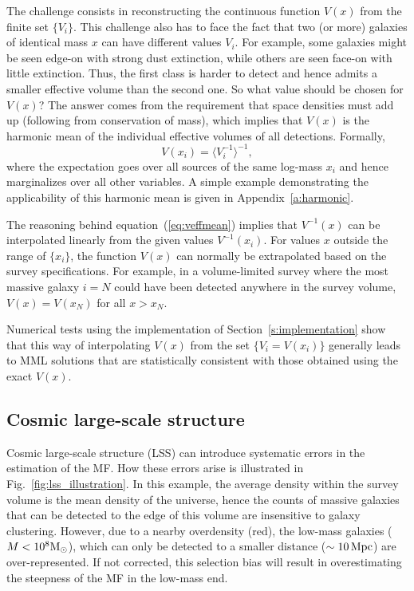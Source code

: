 \documentclass[a4paper,fleqn,usenatbib]{mnras}
\newcommand{\be}{\begin{equation}}
\newcommand{\ee}{\end{equation}}
\newcommand{\msun}{{\rm M}_{\odot}}
\newcommand{\veff}{V}%
\newcommand{\fig}[1]{Fig.~\ref{fig:#1}}
\newcommand{\eq}[1]{equation~(\ref{eq:#1})}
\newcommand{\s}[1]{Section~\ref{s:#1}}
\renewcommand{\a}[1]{Appendix~\ref{a:#1}}
\begin{document}
The challenge consists in reconstructing the continuous function $\veff(x)$ from the finite set $\{V_i\}$. This challenge also has to face the fact that two (or more) galaxies of identical mass $x$ can have different values $V_i$. For example, some galaxies might be seen edge-on with strong dust extinction, while others are seen face-on with little extinction. Thus, the first class is harder to detect and hence admits a smaller effective volume than the second one. So what value should be chosen for $\veff(x)$? The answer comes from the requirement that space densities must add up (following from conservation of mass), which implies that $\veff(x)$ is the harmonic mean of the individual effective volumes of all detections. Formally,
%
\be\label{eq:veffmean}
	\veff(x_i)=\big\langle V_i^{-1}\big\rangle^{-1},
\ee
%
where the expectation goes over all sources of the same log-mass $x_i$ and hence marginalizes over all other variables. A simple example demonstrating the applicability of this harmonic mean is given in \a{harmonic}.

The reasoning behind \eq{veffmean} implies that $\veff^{-1}(x)$ can be interpolated linearly from the given values $V^{-1}(x_i)$.
For values $x$ outside the range of $\{x_i\}$, the function $\veff(x)$ can normally be extrapolated based on the survey specifications. For example, in a volume-limited survey where the most massive galaxy $i=N$ could have been detected anywhere in the survey volume, $\veff(x)=V(x_N)$ for all $x>x_N$.

Numerical tests using the implementation of \s{implementation} show that this way of interpolating $\veff(x)$ from the set $\{V_i=\veff(x_i)\}$ generally leads to MML solutions that are statistically consistent with those obtained using the exact $\veff(x)$.

\subsection{Cosmic large-scale structure}\label{ss:lsstheory}

Cosmic large-scale structure (LSS) can introduce systematic errors in the estimation of the MF. How these errors arise is illustrated in \fig{lss_illustration}. In this example, the average density within the survey volume is the mean density of the universe, hence the counts of massive galaxies that can be detected to the edge of this volume are insensitive to galaxy clustering. However, due to a nearby overdensity (red), the low-mass galaxies ($M<10^8\msun$), which can only be detected to a smaller distance ($\sim10\,\rm Mpc$) are over-represented. If not corrected, this selection bias will result in overestimating the steepness of the MF in the low-mass end.
\end{document}
